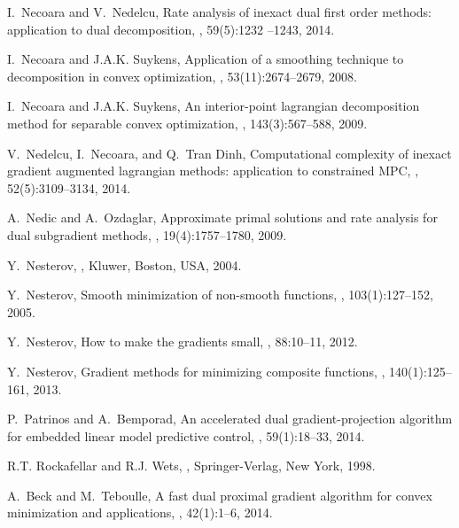 \documentclass{gOMS2e}
\theoremstyle{plain}
\theoremstyle{definition}
\theoremstyle{remark}
\begin{document}
\begin{thebibliography}{99}
I.~Necoara and V.~Nedelcu,
\newblock Rate analysis of inexact dual first order methods: application to  dual decomposition,
, 59(5):1232 --1243, 2014.

I.~Necoara and J.A.K. Suykens,
\newblock Application of a smoothing technique to decomposition in convex optimization,
, 53(11):2674--2679, 2008.

I.~Necoara and J.A.K. Suykens,
\newblock An interior-point lagrangian decomposition method for separable convex optimization,
, 143(3):567--588, 2009.

V.~Nedelcu, I.~Necoara, and Q.~Tran Dinh,
\newblock Computational complexity of inexact gradient augmented lagrangian methods: application to constrained MPC,
, 52(5):3109--3134, 2014.

A.~Nedic and A.~Ozdaglar,
\newblock Approximate primal solutions and rate analysis for dual subgradient methods,
, 19(4):1757--1780, 2009.

Y.~Nesterov,
,
\newblock Kluwer, Boston, USA, 2004.

Y.~Nesterov,
\newblock Smooth minimization of non-smooth functions,
, 103(1):127--152, 2005.

Y.~Nesterov,
\newblock How to make the gradients small,
, 88:10--11, 2012.

Y.~Nesterov,
\newblock Gradient methods for minimizing composite functions,
,
140(1):125--161, 2013.

P.~Patrinos and A.~Bemporad,
\newblock An accelerated dual gradient-projection algorithm for embedded linear model predictive control,
, 59(1):18--33, 2014.

R.T. Rockafellar and R.J. Wets,
,
\newblock Springer-Verlag, New York, 1998.

A.~Beck and M.~Teboulle,
\newblock A fast dual proximal gradient  algorithm for convex minimization and applications,
, 42(1):1--6, 2014.


\end{thebibliography}
\end{document}
